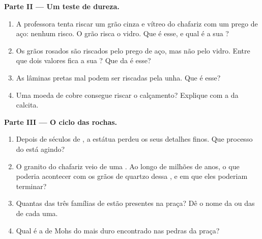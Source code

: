 \begin{problem}
\medskip
\noindent\textbf{Parte II --- Um teste de dureza.}
\begin{enumerate}[resume]
  \item A professora tenta riscar um grão cinza e vítreo do chafariz com um
        prego de aço: nenhum risco. O grão risca o vidro. Que  é
        esse, e qual é a sua ?
  \item Os grãos rosados são riscados pelo prego de aço, mas não pelo
        vidro. Entre que dois valores fica a sua ? Que  da
         é esse?
  \item As lâminas pretas mal podem ser riscadas pela unha. Que  é
        esse?
  \item Uma moeda de cobre consegue riscar o calçamento? Explique com a
         da calcita.
\end{enumerate}

\medskip
\noindent\textbf{Parte III --- O ciclo das rochas.}
\begin{enumerate}[resume]
  \item Depois de séculos de , a estátua perdeu os seus detalhes
        finos. Que processo do  está agindo?
  \item O granito do chafariz veio de uma . Ao longo de milhões de
        anos, o que poderia acontecer com os grãos de quartzo dessa
        , e em que  eles poderiam terminar?
  \item Quantas das três famílias de  estão presentes na praça? Dê o
        nome da  ou das  de cada uma.
  \item Qual é a  de Mohs do  mais duro encontrado nas pedras
        da praça?
\end{enumerate}
\end{problem}
